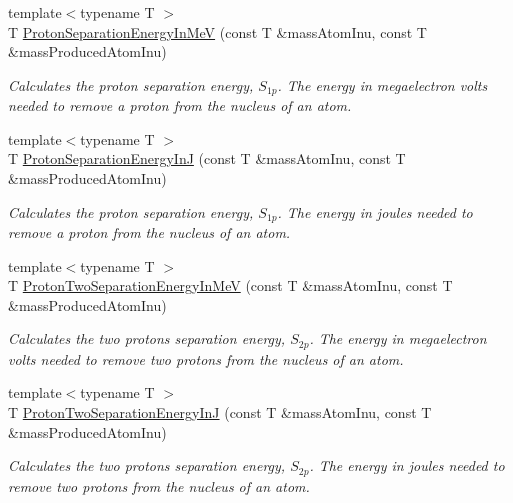 \begin{DoxyCompactItemize}
{\footnotesize template$<$typename T $>$ }\\T \mbox{\hyperlink{group___e_g_x_phys-_nuclear_separation_energy_ga6a619ded55c47ed22ea2d8a85202ebeb}{Proton\+Separation\+Energy\+In\+MeV}} (const T \&mass\+Atom\+Inu, const T \&mass\+Produced\+Atom\+Inu)
\begin{DoxyCompactList}\small\item\em Calculates the proton separation energy, $S_{1p}$. The energy in megaelectron volts needed to remove a proton from the nucleus of an atom. \end{DoxyCompactList}\item 
{\footnotesize template$<$typename T $>$ }\\T \mbox{\hyperlink{group___e_g_x_phys-_nuclear_separation_energy_ga4274d8f5a3860169fd81970707eb582a}{Proton\+Separation\+Energy\+InJ}} (const T \&mass\+Atom\+Inu, const T \&mass\+Produced\+Atom\+Inu)
\begin{DoxyCompactList}\small\item\em Calculates the proton separation energy, $S_{1p}$. The energy in joules needed to remove a proton from the nucleus of an atom. \end{DoxyCompactList}\item 
{\footnotesize template$<$typename T $>$ }\\T \mbox{\hyperlink{group___e_g_x_phys-_nuclear_separation_energy_ga0de42783a7c650eb32f85dc2d40d84d7}{Proton\+Two\+Separation\+Energy\+In\+MeV}} (const T \&mass\+Atom\+Inu, const T \&mass\+Produced\+Atom\+Inu)
\begin{DoxyCompactList}\small\item\em Calculates the two protons separation energy, $S_{2p}$. The energy in megaelectron volts needed to remove two protons from the nucleus of an atom. \end{DoxyCompactList}\item 
{\footnotesize template$<$typename T $>$ }\\T \mbox{\hyperlink{group___e_g_x_phys-_nuclear_separation_energy_gad7c1d4a32daa8aaa53c5fce37c421f82}{Proton\+Two\+Separation\+Energy\+InJ}} (const T \&mass\+Atom\+Inu, const T \&mass\+Produced\+Atom\+Inu)
\begin{DoxyCompactList}\small\item\em Calculates the two protons separation energy, $S_{2p}$. The energy in joules needed to remove two protons from the nucleus of an atom. \end{DoxyCompactList}\item 

\end{DoxyCompactItemize}
